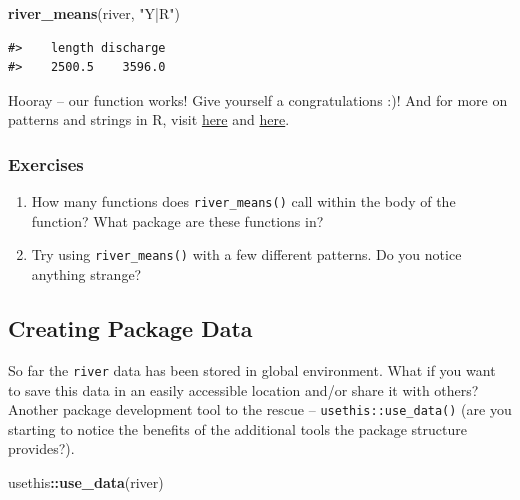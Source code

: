 \documentclass[
]{book}
\newenvironment{Shaded}{\begin{snugshade}}{\end{snugshade}}
\newcommand{\KeywordTok}[1]{\textcolor[rgb]{0.13,0.29,0.53}{\textbf{#1}}}
\newcommand{\NormalTok}[1]{#1}
\newcommand{\OperatorTok}[1]{\textcolor[rgb]{0.81,0.36,0.00}{\textbf{#1}}}
\newcommand{\StringTok}[1]{\textcolor[rgb]{0.31,0.60,0.02}{#1}}
\begin{document}
\begin{Shaded}
\begin{Highlighting}[]
\KeywordTok{river_means}\NormalTok{(river, }\StringTok{"Y|R"}\NormalTok{)}
\end{Highlighting}
\end{Shaded}

\begin{verbatim}
#>    length discharge 
#>    2500.5    3596.0
\end{verbatim}

Hooray -- our function works! Give yourself a congratulations :)! And for more on patterns and strings in R, visit \href{https://r4ds.had.co.nz/strings.html}{here} and \href{https://bookdown.org/rdpeng/rprogdatascience/regular-expressions.html\#sub-and-gsub}{here}.

\hypertarget{ex-set2}{%
\subsubsection{Exercises}\label{ex-set2}}

\begin{enumerate}
\def\labelenumi{\arabic{enumi}.}
\item
  How many functions does \texttt{river\_means()} call within the body of the function? What package are these functions in?
\item
  Try using \texttt{river\_means()} with a few different patterns. Do you notice anything strange?
\end{enumerate}

\hypertarget{creating-data}{%
\subsection{Creating Package Data}\label{creating-data}}

So far the \texttt{river} data has been stored in global environment. What if you want to save this data in an easily accessible location and/or share it with others? Another package development tool to the rescue -- \texttt{usethis::use\_data()} (are you starting to notice the benefits of the additional tools the package structure provides?).

\begin{Shaded}
\begin{Highlighting}[]
\NormalTok{usethis}\OperatorTok{::}\KeywordTok{use_data}\NormalTok{(river)}
\end{Highlighting}
\end{Shaded}
\end{document}
